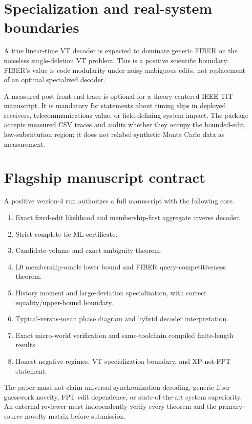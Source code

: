 \documentclass[11pt]{article}
\theoremstyle{definition}
\theoremstyle{remark}
\begin{document}
\section{Specialization and real-system boundaries}
A true linear-time VT decoder is expected to dominate generic FIBER on the noiseless single-deletion VT problem.  This is a positive scientific boundary: FIBER's value is code modularity under noisy ambiguous edits, not replacement of an optimal specialized decoder.

A measured post-front-end trace is optional for a theory-centered IEEE TIT manuscript.  It is mandatory for statements about timing slips in deployed receivers, telecommunications value, or field-defining system impact.  The package accepts measured CSV traces and audits whether they occupy the bounded-edit, low-substitution region; it does not relabel synthetic Monte Carlo data as measurement.

\section{Flagship manuscript contract}
A positive version-4 run authorizes a full manuscript with the following core.
\begin{enumerate}[leftmargin=2em]
\item Exact fixed-edit likelihood and membership-first aggregate inverse decoder.
\item Strict complete-tie ML certificate.
\item Candidate-volume and exact ambiguity theorem.
\item L0 membership-oracle lower bound and FIBER query-competitiveness theorem.
\item History moment and large-deviation specialization, with correct equality/upper-bound boundary.
\item Typical-versus-mean phase diagram and hybrid decoder interpretation.
\item Exact micro-world verification and same-toolchain compiled finite-length results.
\item Honest negative regimes, VT specialization boundary, and XP-not-FPT statement.
\end{enumerate}

The paper must not claim universal synchronization decoding, generic fiber-guesswork novelty, FPT edit dependence, or state-of-the-art system superiority.  An external reviewer must independently verify every theorem and the primary-source novelty matrix before submission.
\end{document}
